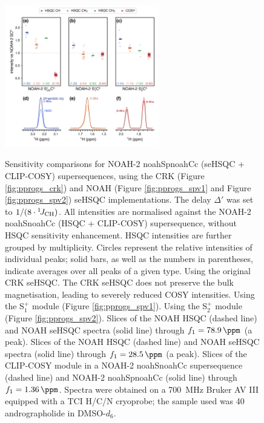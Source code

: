 \documentclass[11pt]{article}
\newcommand*{\noahtwo}[2]{\csname noah#1\endcsname\csname noah#2\endcsname}
\newcommand*{\noahSpa}{S$^+_1$}
\newcommand*{\noahSpb}{S$^+_2$}
\newcommand*{\onejch}{{}^{1}\!J_{\ce{CH}}}
\newcommand*{\figref}[1]{Figure \ref{fig:#1}}
\newcommand*{\andro}{Spectra were obtained on a \SI{700}{\MHz} Bruker AV III equipped with a TCI H/C/N cryoprobe; the sample used was \SI{40}{\milli\molar} andrographolide in DMSO-$d_6$.}
\begin{document}
\begin{figure}
    \centering
    \includegraphics[width=0.6\textwidth]{sehsqc_comp.png}
    {\label{fig:sehsqc_comp_crk}}
    {\label{fig:sehsqc_comp_spv1}}
    {\label{fig:sehsqc_comp_spv2}}
    {\label{fig:sehsqc_comp_ex_ch}}
    {\label{fig:sehsqc_comp_ex_ch2}}
    {\label{fig:sehsqc_comp_ex_cosy}}
    \caption{
        Sensitivity comparisons for NOAH-2 \noahtwo{Sp}{Cc} (seHSQC + CLIP-COSY) supersequences, using the CRK (\figref{pprogs_crk}) and NOAH (\figref{pprogs_spv1} and \figref{pprogs_spv2}) seHSQC implementations.
        The delay $\Delta'$ was set to $1/(8\cdot\onejch)$.
        All intensities are normalised against the NOAH-2 \noahtwo{S}{Cc} (HSQC + CLIP-COSY) supersequence, without HSQC sensitivity enhancement.
        HSQC intensities are further grouped by multiplicity.
        Circles represent the relative intensities of individual peaks; solid bars, as well as the numbers in parentheses, indicate averages over all peaks of a given type.
        \textbf{} Using the original CRK seHSQC.
        The CRK seHSQC does not preserve the bulk magnetisation, leading to severely reduced COSY intensities.
        \textbf{} Using the \noahSpa{} module (\figref{pprogs_spv1}).
        \textbf{} Using the \noahSpb{} module (\figref{pprogs_spv2}).
        \textbf{} Slices of the NOAH HSQC (dashed line) and NOAH seHSQC spectra (solid line) through $f_1 = \SI{78.9}{\ppm}$ (a  peak).
        \textbf{} Slices of the NOAH HSQC (dashed line) and NOAH seHSQC spectra (solid line) through $f_1 = \SI{28.5}{\ppm}$ (a  peak).
        \textbf{} Slices of the CLIP-COSY module in a NOAH-2 \noahtwo{S}{Cc} supersequence (dashed line) and NOAH-2 \noahtwo{Sp}{Cc} (solid line) through $f_1 = \SI{1.36}{\ppm}$.
        \andro{}
    }
    \label{fig:sehsqc_comp}
\end{figure}
\end{document}
